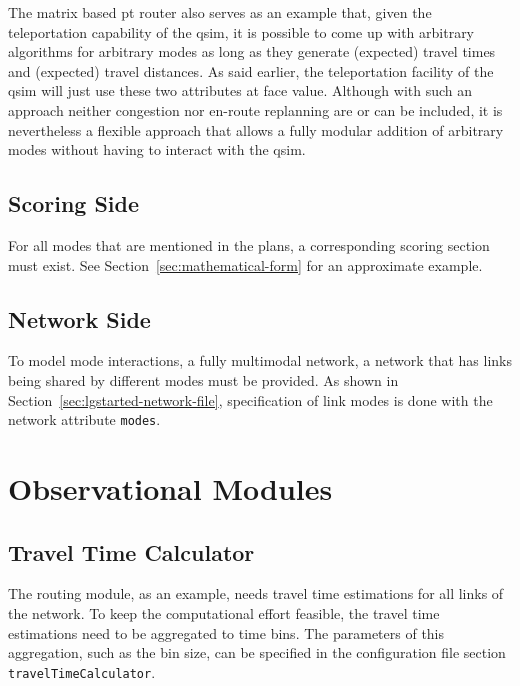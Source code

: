 The matrix based pt router also serves as an example that, given the teleportation capability of the \gls{qsim}, it is possible to come up with arbitrary algorithms for arbitrary modes as long as they generate (expected) travel times and (expected) travel distances.  As said earlier, the \gls{teleportation} facility of the \gls{qsim} will just use these two attributes at face value.  Although with such an approach neither congestion nor en-route replanning are or can be included, it is nevertheless a flexible approach that allows a fully modular addition of arbitrary modes without having to interact with the \gls{qsim}.

\subsection{Scoring Side}
For all modes that are mentioned in the plans, a corresponding scoring section must exist.  See Section~\ref{sec:mathematical-form} for an approximate example.

\subsection{Network Side}
To model mode interactions, a fully \gls{multimodal} network, \ie a network that has links being shared by different modes must be provided. 
As shown in Section~\ref{sec:lgstarted-network-file}, specification of link modes is done with the network attribute \lstinline|modes|.

\section{Observational Modules}
\label{sec:observational}

\subsection{Travel Time Calculator}
\label{sec:ttc}
The routing module, as an example, needs travel time estimations for all links of the network. To keep the computational effort feasible, the travel time estimations need to be aggregated to time bins. The parameters of this aggregation, such as the bin size, can be specified in the configuration file section \lstinline|travelTimeCalculator|.

